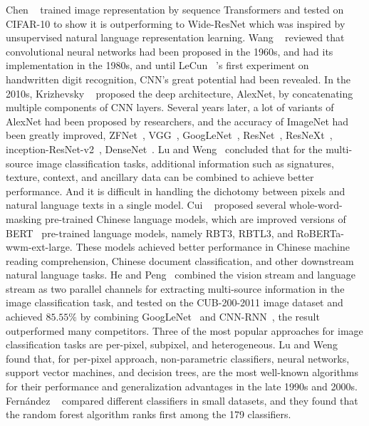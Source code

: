 \documentclass[10pt,twocolumn,letterpaper]{article}
\begin{document}
  Chen \etal~\cite{chen2020generative} trained image representation by sequence Transformers and tested on CIFAR-10 to show it is outperforming to Wide-ResNet
which was inspired by unsupervised natural language representation learning.
  Wang \etal~\cite{wang2019development} reviewed that convolutional neural networks had been proposed in the 1960s, and had its implementation in the 1980s,
and until LeCun \etal~\cite{lecun1990handwritten}'s first experiment on handwritten digit recognition, CNN's great potential had been revealed.
  In the 2010s, Krizhevsky \etal~\cite{krizhevsky2012imagenet} proposed the deep architecture, AlexNet, by concatenating multiple components of CNN layers.
Several years later, a lot of variants of AlexNet had been proposed by researchers, and the accuracy of ImageNet had been greatly improved, \eg ZFNet~\cite{zeiler2014visualizing}, VGG~\cite{simonyan2014very}, GoogLeNet~\cite{szegedy2015going}, ResNet~\cite{he2016deep},
 ResNeXt~\cite{xie2017aggregated}, inception-ResNet-v2~\cite{szegedy2016inception}, DenseNet~\cite{huang2016deep}.
  Lu and Weng~\cite{lu2007survey} concluded that for the multi-source image classification tasks, additional information such as signatures, texture, context, and ancillary data can be combined to achieve better performance.
And it is difficult in handling the dichotomy between pixels and natural language texts in a single model.
  Cui \etal~\cite{cui2020revisiting} proposed several whole-word-masking pre-trained Chinese language models,
which are improved versions of BERT~\cite{devlin2019bert} pre-trained language models, namely RBT3, RBTL3, and RoBERTa-wwm-ext-large.
These models achieved better performance in Chinese machine reading comprehension, Chinese document classification, and other downstream natural language tasks.
  He and Peng~\cite{he2017fine} combined the vision stream and language stream as two parallel channels for extracting multi-source information in the image classification task,
and tested on the CUB-200-2011 image dataset and achieved $85.55\%$ by combining GoogLeNet~\cite{szegedy2015going} and CNN-RNN~\cite{reed2016learning}, the result outperformed many competitors.
  Three of the most popular approaches for image classification tasks are per-pixel, subpixel, and heterogeneous.
Lu and Weng found that, for per-pixel approach, non-parametric classifiers, \eg neural networks, support vector machines, and decision trees,
are the most well-known algorithms for their performance and generalization advantages in the late 1990s and 2000s.
  Fern{\'a}ndez \etal~\cite{fernandez2014we} compared different classifiers in small datasets, and they found that the random forest algorithm ranks first among the 179 classifiers.
\end{document}
